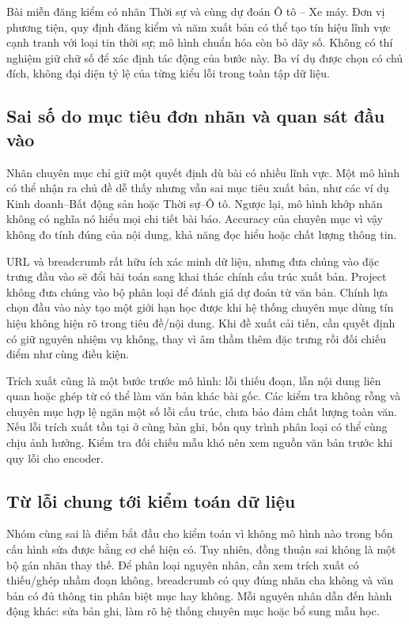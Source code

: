 Bài miễn đăng kiểm có nhãn Thời sự và cùng dự đoán Ô tô -- Xe máy. Đơn vị phương tiện, quy định đăng kiểm và năm xuất bản có thể tạo tín hiệu lĩnh vực cạnh tranh với loại tin thời sự; mô hình chuẩn hóa còn bỏ dãy số. Không có thí nghiệm giữ chữ số để xác định tác động của bước này. Ba ví dụ được chọn có chủ đích, không đại diện tỷ lệ của từng kiểu lỗi trong toàn tập dữ liệu.


\subsection{Sai số do mục tiêu đơn nhãn và quan sát đầu vào}
Nhãn chuyên mục chỉ giữ một quyết định dù bài có nhiều lĩnh vực. Một mô hình có thể nhận ra chủ đề dễ thấy nhưng vẫn sai mục tiêu xuất bản, như các ví dụ Kinh doanh--Bất động sản hoặc Thời sự--Ô tô. Ngược lại, mô hình khớp nhãn không có nghĩa nó hiểu mọi chi tiết bài báo. Accuracy của chuyên mục vì vậy không đo tính đúng của nội dung, khả năng đọc hiểu hoặc chất lượng thông tin.

URL và breadcrumb rất hữu ích xác minh dữ liệu, nhưng đưa chúng vào đặc trưng đầu vào sẽ đổi bài toán sang khai thác chính cấu trúc xuất bản. Project không đưa chúng vào bộ phân loại để đánh giá dự đoán từ văn bản. Chính lựa chọn đầu vào này tạo một giới hạn học được khi hệ thống chuyên mục dùng tín hiệu không hiện rõ trong tiêu đề/nội dung. Khi đề xuất cải tiến, cần quyết định có giữ nguyên nhiệm vụ không, thay vì âm thầm thêm đặc trưng rồi đối chiếu điểm như cùng điều kiện.

Trích xuất cũng là một bước trước mô hình: lỗi thiếu đoạn, lẫn nội dung liên quan hoặc ghép từ có thể làm văn bản khác bài gốc. Các kiểm tra không rỗng và chuyên mục hợp lệ ngăn một số lỗi cấu trúc, chưa bảo đảm chất lượng toàn văn. Nếu lỗi trích xuất tồn tại ở cùng bản ghi, bốn quy trình phân loại có thể cùng chịu ảnh hưởng. Kiểm tra đối chiếu mẫu khó nên xem nguồn văn bản trước khi quy lỗi cho encoder.


\subsection{Từ lỗi chung tới kiểm toán dữ liệu}
Nhóm cùng sai là điểm bắt đầu cho kiểm toán vì không mô hình nào trong bốn cấu hình sửa được bằng cơ chế hiện có. Tuy nhiên, đồng thuận sai không là một bộ gán nhãn thay thế. Để phân loại nguyên nhân, cần xem trích xuất có thiếu/ghép nhầm đoạn không, breadcrumb có quy đúng nhãn cha không và văn bản có đủ thông tin phân biệt mục hay không. Mỗi nguyên nhân dẫn đến hành động khác: sửa bản ghi, làm rõ hệ thống chuyên mục hoặc bổ sung mẫu học.

